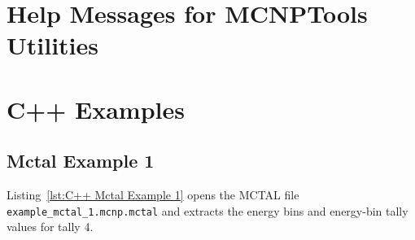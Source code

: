 \documentclass[11pt]{article}
\begin{document}
\newpage \appendix

\section{Help Messages for MCNPTools Utilities}\label{Help Messages for MCNPTools Utilities}



\clearpage


\clearpage


\clearpage


\clearpage


\clearpage


\clearpage


\clearpage


\clearpage
\section{C++ Examples}\label{c-examples}

\subsection{Mctal Example 1}\label{mctal-example-1}

Listing~\ref{lst:C++ Mctal Example 1} opens the MCTAL file
\texttt{example\_mctal\_1.mcnp.mctal} and extracts the energy bins and
energy-bin tally values for tally 4.
\end{document}
